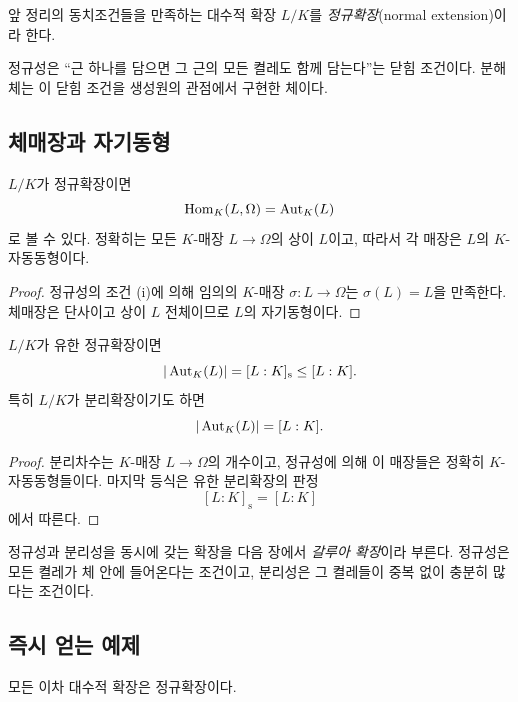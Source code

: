 \begin{definition}[정규확장]
앞 정리의 동치조건들을 만족하는 대수적 확장 $L/K$를 \emph{정규확장}(normal extension)이라 한다.
\end{definition}

\begin{keyidea}
정규성은 ``근 하나를 담으면 그 근의 모든 켤레도 함께 담는다''는 닫힘 조건이다. 분해체는 이 닫힘 조건을 생성원의 관점에서 구현한 체이다.
\end{keyidea}

\subsection{체매장과 자기동형}

\begin{corollary}
$L/K$가 정규확장이면
\[
  \operatorname{Hom}_K(L,\Omega)=\operatorname{Aut}_K(L)
\]
로 볼 수 있다. 정확히는 모든 $K$-매장 $L\to\Omega$의 상이 $L$이고, 따라서 각 매장은 $L$의 $K$-자동동형이다.
\end{corollary}

\begin{proof}
정규성의 조건 (i)에 의해 임의의 $K$-매장 $\sigma:L\to\Omega$는 $\sigma(L)=L$을 만족한다. 체매장은 단사이고 상이 $L$ 전체이므로 $L$의 자기동형이다.
\end{proof}

\begin{corollary}
$L/K$가 유한 정규확장이면
\[
  |\operatorname{Aut}_K(L)|=[L:K]_{\mathrm s}\le [L:K].
\]
특히 $L/K$가 분리확장이기도 하면
\[
  |\operatorname{Aut}_K(L)|=[L:K].
\]
\end{corollary}

\begin{proof}
분리차수는 $K$-매장 $L\to\Omega$의 개수이고, 정규성에 의해 이 매장들은 정확히 $K$-자동동형들이다. 마지막 등식은 유한 분리확장의 판정
\[
  [L:K]_{\mathrm s}=[L:K]
\]
에서 따른다.
\end{proof}

\begin{remark}
정규성과 분리성을 동시에 갖는 확장을 다음 장에서 \emph{갈루아 확장}이라 부른다. 정규성은 모든 켤레가 체 안에 들어온다는 조건이고, 분리성은 그 켤레들이 중복 없이 충분히 많다는 조건이다.
\end{remark}

\subsection{즉시 얻는 예제}

\begin{proposition}
모든 이차 대수적 확장은 정규확장이다.
\end{proposition}


